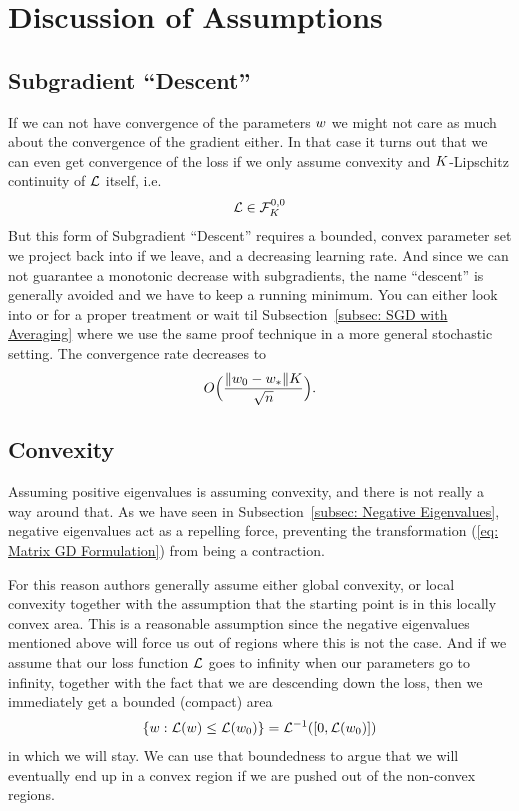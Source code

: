 \section{Discussion of Assumptions}

\subsection{Subgradient ``Descent''}\label{subsec: subgradient method}

If we can not have convergence of the parameters \(\weights\) we might not
care as much about the convergence of the gradient either. In that case it
turns out that we can even get convergence of the loss if we only assume
convexity and \(\lipConst\)-Lipschitz continuity of \(\Loss\) itself, i.e.
\begin{align*}
	\Loss \in \lipGradientSet[0,0]{\lipConst}
\end{align*}
%
But this form of Subgradient ``Descent''
requires a bounded, convex parameter set we project back into if we leave, and
a decreasing learning rate. And since we can not guarantee a monotonic decrease
with subgradients, the name ``descent'' is generally avoided and we have to keep
a running minimum. You can either look into \textcite[Section
2.2.3]{nesterovLecturesConvexOptimization2018} or \textcite[Section
2.1]{bubeckConvexOptimizationAlgorithms2015} for a proper
treatment or wait til Subsection~\ref{subsec: SGD with Averaging} where we use
the same proof technique in a more general stochastic setting. The convergence
rate decreases to
\begin{align*}
	O\Big(\frac{\|\weights_0-\weights_*\|\lipConst}{\sqrt{n}}\Big).
\end{align*}

\subsection{Convexity}

Assuming positive eigenvalues is assuming convexity, and there is not really a
way around that. As we have seen in Subsection~\ref{subsec: Negative
Eigenvalues}, negative eigenvalues act as a repelling force, preventing the
transformation (\ref{eq: Matrix GD Formulation}) from being a contraction.

For this reason authors generally assume either global convexity, or local
convexity together with the assumption that the starting point is in this
locally convex area. This is a reasonable assumption since the negative
eigenvalues mentioned above will force us out of regions where this is not
the case. And if we assume that our loss function \(\Loss\) goes to infinity when
our parameters go to infinity, together with the fact that we are descending
down the loss, then we immediately get a bounded (compact) area 
%
\begin{align*}
	\{\weights : \Loss(\weights) \le \Loss(\weights_0)\} = \Loss^{-1}([0, \Loss(\weights_0)])
\end{align*}
%
in which we will stay. We can use that boundedness to argue that we will
eventually end up in a convex region if we are pushed out of the non-convex
regions.

